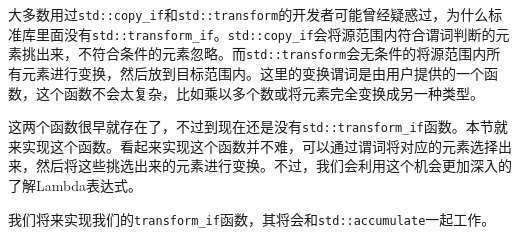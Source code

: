 大多数用过\texttt{std::copy\_if}和\texttt{std::transform}的开发者可能曾经疑惑过，为什么标准库里面没有\texttt{std::transform\_if}。\texttt{std::copy\_if}会将源范围内符合谓词判断的元素挑出来，不符合条件的元素忽略。而\texttt{std::transform}会无条件的将源范围内所有元素进行变换，然后放到目标范围内。这里的变换谓词是由用户提供的一个函数，这个函数不会太复杂，比如乘以多个数或将元素完全变换成另一种类型。

这两个函数很早就存在了，不过到现在还是没有\texttt{std::transform\_if}函数。本节就来实现这个函数。看起来实现这个函数并不难，可以通过谓词将对应的元素选择出来，然后将这些挑选出来的元素进行变换。不过，我们会利用这个机会更加深入的了解Lambda表达式。


我们将来实现我们的\texttt{transform\_if}函数，其将会和\texttt{std::accumulate}一起工作。


